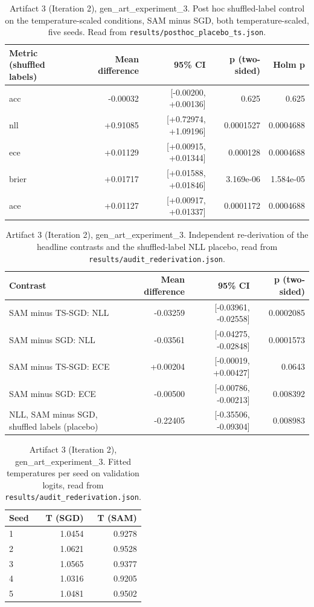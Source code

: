 \documentclass[11pt,letterpaper]{article}
\begin{document}
\begin{table}[!htbp]
\centering
\scriptsize
\caption{Artifact 3 (Iteration 2), gen\_art\_experiment\_3. Post hoc shuffled-label control on the temperature-scaled conditions, SAM minus SGD, both temperature-scaled, five seeds. Read from \texttt{results/posthoc\_placebo\_ts.json}.}
\label{tab:posthoc3}
\begin{tabular}{lrrrr}
\toprule
Metric (shuffled labels) & Mean difference & 95\% CI & p (two-sided) & Holm p \\
\midrule
acc & -0.00032 & [-0.00200, +0.00136] & 0.625 & 0.625 \\
nll & +0.91085 & [+0.72974, +1.09196] & 0.0001527 & 0.0004688 \\
ece & +0.01129 & [+0.00915, +0.01344] & 0.000128 & 0.0004688 \\
brier & +0.01717 & [+0.01588, +0.01846] & 3.169e-06 & 1.584e-05 \\
ace & +0.01127 & [+0.00917, +0.01337] & 0.0001172 & 0.0004688 \\
\bottomrule
\end{tabular}
\end{table}
\begin{table}[!htbp]
\centering
\scriptsize
\caption{Artifact 3 (Iteration 2), gen\_art\_experiment\_3. Independent re-derivation of the headline contrasts and the shuffled-label NLL placebo, read from \texttt{results/audit\_rederivation.json}.}
\label{tab:audit3}
\begin{tabular}{lrrr}
\toprule
Contrast & Mean difference & 95\% CI & p (two-sided) \\
\midrule
SAM minus TS-SGD: NLL & -0.03259 & [-0.03961, -0.02558] & 0.0002085 \\
SAM minus SGD: NLL & -0.03561 & [-0.04275, -0.02848] & 0.0001573 \\
SAM minus TS-SGD: ECE & +0.00204 & [-0.00019, +0.00427] & 0.0643 \\
SAM minus SGD: ECE & -0.00500 & [-0.00786, -0.00213] & 0.008392 \\
NLL, SAM minus SGD, shuffled labels (placebo) & -0.22405 & [-0.35506, -0.09304] & 0.008983 \\
\bottomrule
\end{tabular}
\end{table}
\begin{table}[!htbp]
\centering
\footnotesize
\caption{Artifact 3 (Iteration 2), gen\_art\_experiment\_3. Fitted temperatures per seed on validation logits, read from \texttt{results/audit\_rederivation.json}.}
\label{tab:temps3}
\begin{tabular}{lrr}
\toprule
Seed & T (SGD) & T (SAM) \\
\midrule
1 & 1.0454 & 0.9278 \\
2 & 1.0621 & 0.9528 \\
3 & 1.0565 & 0.9377 \\
4 & 1.0316 & 0.9205 \\
5 & 1.0481 & 0.9502 \\
\bottomrule
\end{tabular}
\end{table}
\end{document}
